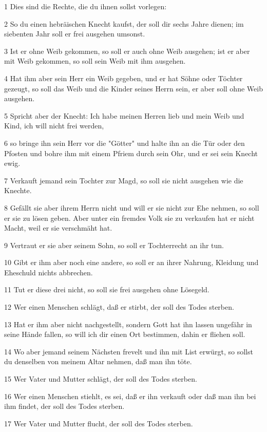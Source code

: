 \par 1 Dies sind die Rechte, die du ihnen sollst vorlegen:
\par 2 So du einen hebräischen Knecht kaufst, der soll dir sechs Jahre dienen; im siebenten Jahr soll er frei ausgehen umsonst.
\par 3 Ist er ohne Weib gekommen, so soll er auch ohne Weib ausgehen; ist er aber mit Weib gekommen, so soll sein Weib mit ihm ausgehen.
\par 4 Hat ihm aber sein Herr ein Weib gegeben, und er hat Söhne oder Töchter gezeugt, so soll das Weib und die Kinder seines Herrn sein, er aber soll ohne Weib ausgehen.
\par 5 Spricht aber der Knecht: Ich habe meinen Herren lieb und mein Weib und Kind, ich will nicht frei werden,
\par 6 so bringe ihn sein Herr vor die "Götter" und halte ihn an die Tür oder den Pfosten und bohre ihm mit einem Pfriem durch sein Ohr, und er sei sein Knecht ewig.
\par 7 Verkauft jemand sein Tochter zur Magd, so soll sie nicht ausgehen wie die Knechte.
\par 8 Gefällt sie aber ihrem Herrn nicht und will er sie nicht zur Ehe nehmen, so soll er sie zu lösen geben. Aber unter ein fremdes Volk sie zu verkaufen hat er nicht Macht, weil er sie verschmäht hat.
\par 9 Vertraut er sie aber seinem Sohn, so soll er Tochterrecht an ihr tun.
\par 10 Gibt er ihm aber noch eine andere, so soll er an ihrer Nahrung, Kleidung und Eheschuld nichts abbrechen.
\par 11 Tut er diese drei nicht, so soll sie frei ausgehen ohne Lösegeld.
\par 12 Wer einen Menschen schlägt, daß er stirbt, der soll des Todes sterben.
\par 13 Hat er ihm aber nicht nachgestellt, sondern Gott hat ihn lassen ungefähr in seine Hände fallen, so will ich dir einen Ort bestimmen, dahin er fliehen soll.
\par 14 Wo aber jemand seinem Nächsten frevelt und ihn mit List erwürgt, so sollst du denselben von meinem Altar nehmen, daß man ihn töte.
\par 15 Wer Vater und Mutter schlägt, der soll des Todes sterben.
\par 16 Wer einen Menschen stiehlt, es sei, daß er ihn verkauft oder daß man ihn bei ihm findet, der soll des Todes sterben.
\par 17 Wer Vater und Mutter flucht, der soll des Todes sterben.
